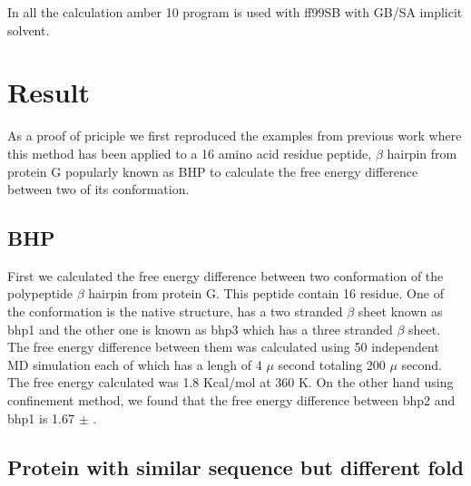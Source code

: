 \documentclass[12pt]{article}
\begin{document}
In all the calculation amber 10 program is used with ff99SB with GB/SA implicit solvent. 

\section{Result}

As a proof of priciple we first reproduced the examples from previous work where this method has been applied to a 
16 amino acid residue peptide, $\beta$ hairpin from protein G popularly known as BHP to calculate the free energy difference 
between two of its conformation.   

\subsection{BHP}

First we calculated the free energy difference between two conformation of the polypeptide $\beta$ hairpin from protein G.  
This peptide contain 16 residue. One of the conformation is the 
native structure, has a two stranded $\beta$ sheet known as bhp1 and the other one is known as bhp3 which has a three stranded $\beta$ sheet.
The free energy difference between them was calculated using 50 independent MD simulation each of which has a lengh of 4 $\mu$ second totaling
200 $\mu$ second. The free energy calculated was 1.8 Kcal/mol at 360 K. On the other hand using confinement method, we found that the 
free energy difference between bhp2 and bhp1 is 1.67 $\pm$  .

\subsection{Protein with similar sequence but different fold}
\end{document}
